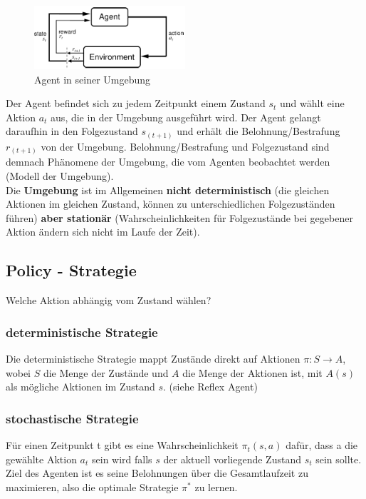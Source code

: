 \documentclass[10pt]{scrartcl}
\begin{document}
\begin{figure}[htbp]
	\centering	\includegraphics[width=0.5\textwidth]{Bilder/Agent.png}
	\caption{Agent in seiner Umgebung}
	\label{fig:Agent}
\end{figure}

Der Agent befindet sich zu jedem Zeitpunkt  einem Zustand $s_{t}$ und wählt eine Aktion $a_{t}$ aus, die in der Umgebung ausgeführt wird. Der Agent gelangt daraufhin in den Folgezustand $s_{(t+1)}$ und erhält die Belohnung/Bestrafung $r_{(t+1)}$ von der Umgebung. Belohnung/Bestrafung und Folgezustand sind demnach Phänomene der Umgebung, die vom Agenten beobachtet werden (Modell der Umgebung).\\
Die \textbf{Umgebung} ist im Allgemeinen \textbf{nicht deterministisch} (die gleichen Aktionen im gleichen Zustand, können zu unterschiedlichen Folgezuständen führen) \textbf{aber stationär} (Wahrscheinlichkeiten für Folgezustände bei gegebener Aktion ändern sich nicht im Laufe der Zeit).

\subsection{Policy - Strategie}
Welche Aktion abhängig vom Zustand wählen?

\subsubsection{deterministische Strategie}
Die deterministische Strategie mappt Zustände direkt auf Aktionen $\pi: S \rightarrow A$, wobei $S$ die Menge der Zustände und $A$ die Menge der Aktionen ist, mit $A(s)$ als mögliche Aktionen im Zustand $s$. (siehe Reflex Agent)

\subsubsection{stochastische Strategie}
Für einen Zeitpunkt t gibt es eine Wahrscheinlichkeit $\pi_{t}(s,a)$ dafür, dass a die gewählte Aktion $a_{t}$ sein wird falls $s$ der aktuell vorliegende Zustand $s_{t}$ sein sollte. Ziel des Agenten ist es seine Belohnungen über die Gesamtlaufzeit zu maximieren, also die optimale Strategie $\pi^{*}$ zu lernen.
\end{document}
